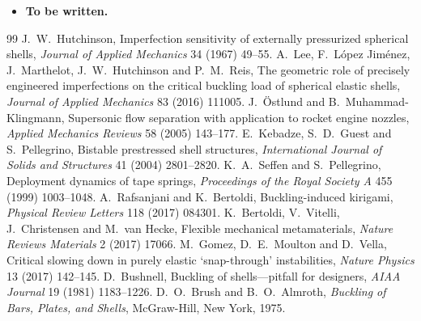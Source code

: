 \begin{gbox*}
\begin{itemize}
  \item \textbf{To be written.} 
\end{itemize}
\end{gbox*}

\label{sec:sh-exo}

\begin{chapterbib}{99}
 J.~W.~Hutchinson, Imperfection sensitivity of externally pressurized spherical shells, \emph{Journal of Applied Mechanics} 34 (1967) 49--55.
 A.~Lee, F.~L\'opez Jim\'enez, J.~Marthelot, J.~W.~Hutchinson and P.~M.~Reis, The geometric role of precisely engineered imperfections on the critical buckling load of spherical elastic shells, \emph{Journal of Applied Mechanics} 83 (2016) 111005.
 J.~\"Ostlund and B.~Muhammad-Klingmann, Supersonic flow separation with application to rocket engine nozzles, \emph{Applied Mechanics Reviews} 58 (2005) 143--177.
 E.~Kebadze, S.~D.~Guest and S.~Pellegrino, Bistable prestressed shell structures, \emph{International Journal of Solids and Structures} 41 (2004) 2801--2820.
 K.~A.~Seffen and S.~Pellegrino, Deployment dynamics of tape springs, \emph{Proceedings of the Royal Society A} 455 (1999) 1003--1048.
 A.~Rafsanjani and K.~Bertoldi, Buckling-induced kirigami, \emph{Physical Review Letters} 118 (2017) 084301.
 K.~Bertoldi, V.~Vitelli, J.~Christensen and M.~van Hecke, Flexible mechanical metamaterials, \emph{Nature Reviews Materials} 2 (2017) 17066.
 M.~Gomez, D.~E.~Moulton and D.~Vella, Critical slowing down in purely elastic `snap-through' instabilities, \emph{Nature Physics} 13 (2017) 142--145.
 D.~Bushnell, Buckling of shells---pitfall for designers, \emph{AIAA Journal} 19 (1981) 1183--1226.
 D.~O.~Brush and B.~O.~Almroth, \emph{Buckling of Bars, Plates, and Shells}, McGraw-Hill, New York, 1975.
\end{chapterbib}
